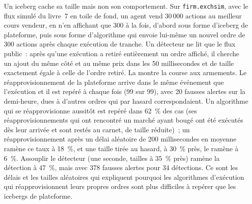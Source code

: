 Un iceberg cache sa taille mais non son comportement. Sur \texttt{firm.exchsim}, avec le flux simulé du livre~7 en toile de fond, un agent vend 30\,000 actions
au meilleur cours vendeur, en n'en affichant que 300 à la fois, d'abord sous forme d'iceberg de plateforme, puis sous forme d'algorithme qui envoie lui-même un nouvel ordre de 300 actions après chaque exécution de tranche. Un
détecteur ne lit que le flux public~: après qu'une exécution a retiré entièrement un ordre affiché, il cherche un ajout du même côté et au même prix dans les 50
millisecondes et de taille exactement égale à celle de l'ordre retiré. La  montre la course aux armements. Le réapprovisionnement de la plateforme arrive
dans le même événement que l'exécution et il est repéré à chaque fois (99 sur 99), avec 20 fausses alertes sur la demi-heure, dues à d'autres ordres qui par hasard
correspondaient. Un algorithme qui se réapprovisionne aussitôt est repéré dans 62~\% des cas (ses réapprovisionnements qui ont rencontré un marché ayant bougé ont été exécutés dès leur arrivée et sont restés
au carnet, de taille réduite)~; un réapprovisionnement après un délai aléatoire de 200 millisecondes en moyenne ramène ce taux à 18~\%, et une taille tirée au hasard, à 30~\% près, le ramène à 6~\%. Assouplir le
détecteur (une seconde, tailles à 35~\% près) ramène la détection à 47~\%, mais avec 378 fausses alertes pour 34 détections. Ce sont les délais et les tailles aléatoires qui
expliquent pourquoi les algorithmes d'exécution qui réapprovisionnent leurs propres ordres sont plus difficiles à repérer que les icebergs de plateforme.

